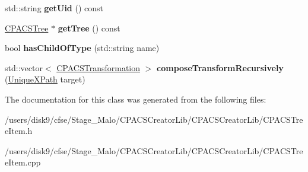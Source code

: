 \begin{DoxyCompactItemize}
\item 
\hypertarget{classcpcr_1_1CPACSTreeItem_a99939b1541ce69714e660f557b2de89d}{std\-::string {\bfseries get\-Uid} () const }\label{classcpcr_1_1CPACSTreeItem_a99939b1541ce69714e660f557b2de89d}

\item 
\hypertarget{classcpcr_1_1CPACSTreeItem_aee254391d09f88ba9cef782ad546bee0}{\hyperlink{classcpcr_1_1CPACSTree}{C\-P\-A\-C\-S\-Tree} $\ast$ {\bfseries get\-Tree} () const }\label{classcpcr_1_1CPACSTreeItem_aee254391d09f88ba9cef782ad546bee0}

\item 
\hypertarget{classcpcr_1_1CPACSTreeItem_a930b692b28895d354d2715517618b4fa}{bool {\bfseries has\-Child\-Of\-Type} (std\-::string name)}\label{classcpcr_1_1CPACSTreeItem_a930b692b28895d354d2715517618b4fa}

\item 
\hypertarget{classcpcr_1_1CPACSTreeItem_a6bd618d2b4bdc9ae87f1ac12b25f0f7c}{std\-::vector$<$ \hyperlink{classcpcr_1_1CPACSTransformation}{C\-P\-A\-C\-S\-Transformation} $>$ {\bfseries compose\-Transform\-Recursively} (\hyperlink{classcpcr_1_1UniqueXPath}{Unique\-X\-Path} target)}\label{classcpcr_1_1CPACSTreeItem_a6bd618d2b4bdc9ae87f1ac12b25f0f7c}

\end{DoxyCompactItemize}


The documentation for this class was generated from the following files\-:\begin{DoxyCompactItemize}
\item 
/users/disk9/cfse/\-Stage\-\_\-\-Malo/\-C\-P\-A\-C\-S\-Creator\-Lib/\-C\-P\-A\-C\-S\-Creator\-Lib/C\-P\-A\-C\-S\-Tree\-Item.\-h\item 
/users/disk9/cfse/\-Stage\-\_\-\-Malo/\-C\-P\-A\-C\-S\-Creator\-Lib/\-C\-P\-A\-C\-S\-Creator\-Lib/C\-P\-A\-C\-S\-Tree\-Item.\-cpp\end{DoxyCompactItemize}
